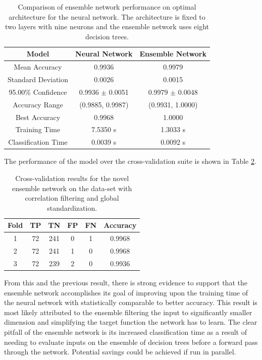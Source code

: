 \documentclass[paper=a4, fontsize=11pt]{scrartcl} %
\begin{document}
\begin{table}[H]
	\centering
	\caption{Comparison of ensemble network performance on optimal architecture for the neural network. The architecture is fixed to two layers with nine neurons and the ensemble network uses eight decision trees.}
	\begin{tabular}{|c||c|c|}
		\hline
		\textbf{Model} & \textbf{Neural Network} & \textbf{Ensemble Network} \\ \hline \hline
		Mean Accuracy & 0.9936 & 0.9979 \\ \hline
		Standard Deviation & 0.0026 & 0.0015 \\ \hline
		95.00\% Confidence & 0.9936 $\pm$ 0.0051 & 0.9979 $\pm$ 0.0048   \\ \hline
		Accuracy Range & (0.9885, 0.9987) & (0.9931, 1.0000) \\ \hline
		Best Accuracy  & 0.9968 & 1.0000 \\ \hline
		Training Time & 7.5350 s & 1.3033 s \\ \hline
		Classification Time & 0.0039 s &  0.0092 s \\ \hline
	\end{tabular}
	\label{tab: novel compare}
\end{table}

The performance of the model over the cross-validation suite is shown in Table \ref{tab: cv novel compare}.

\begin{table}[H]
	\centering
	\caption{Cross-validation results for the novel ensemble network on the data-set with correlation filtering and global standardization.}
	\begin{tabular}{|c|c|c|c|c|c|}
		\hline
		\textbf{Fold} & \textbf{TP} & \textbf{TN} & \textbf{FP} & \textbf{FN} & \textbf{Accuracy} \\ \hline \hline
		1 & 72 & 241 & 0 & 1 & 0.9968  \\ \hline
		2 & 72 & 241 & 1 & 0 & 0.9968  \\ \hline
		3 & 72 & 239 & 2 & 0 & 0.9936  \\ \hline
	\end{tabular}
	\label{tab: cv novel compare}
\end{table}

From this and the previous result, there is strong evidence to support that the ensemble network accomplishes its goal of improving upon the training time of the neural network with statistically comparable to better accuracy.
This result is most likely attributed to the ensemble filtering the input to significantly smaller dimension and simplifying the target function the network has to learn.
The clear pitfall of the ensemble network is its increased classification time as a result of needing to evaluate inputs on the ensemble of decision trees before a forward pass through the network.
Potential savings could be achieved if run in parallel.
\\
\end{document}
